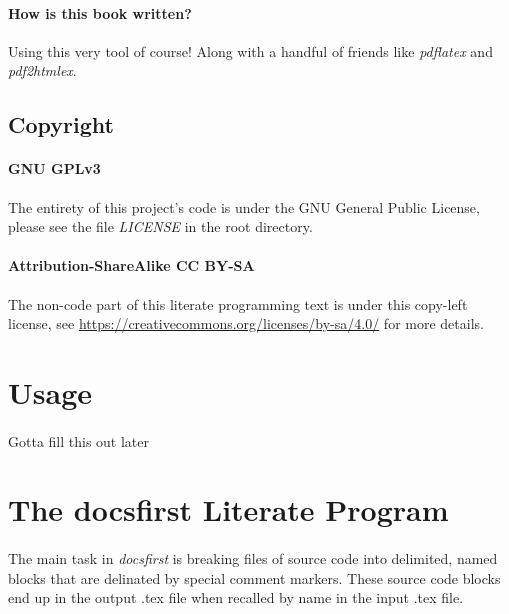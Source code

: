 \documentclass{article}
\begin{document}
\paragraph{How is this book written?} Using this very tool of course! Along with
a handful of friends like \emph{pdflatex} and \emph{pdf2htmlex}.

\subsection{Copyright}

\paragraph{GNU GPLv3} The entirety of this project's code is under the GNU
General Public License, please see the file \emph{LICENSE} in the root
directory.


\paragraph{Attribution-ShareAlike CC BY-SA} The non-code part of this
literate programming text is under this copy-left license, see
\url{https://creativecommons.org/licenses/by-sa/4.0/} for more details.

\section{Usage}

\paragraph{} Gotta fill this out later

\section{The docsfirst Literate Program}

\paragraph{}
The main task in \emph{docsfirst} is breaking files of source code into delimited,
named blocks that are delinated by special comment markers. These source code
blocks end up in the output .tex file when recalled by name in the input .tex
file.

\end{document}

